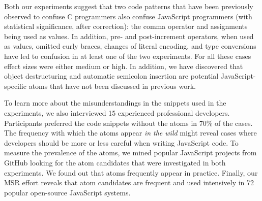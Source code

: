 Both our experiments suggest that two code patterns that have been previously observed to confuse C programmers also confuse JavaScript programmers (with statistical significance, after correction): the comma operator and assignments being used as values. In addition, pre- and post-increment operators, when used as values, omitted curly braces, changes of literal encoding, and type conversions have led to confusion in at least one of the two experiments. For all these cases effect sizes were either medium or high. In addition, we have discovered that object destructuring and automatic semicolon insertion are potential JavaScript-specific atoms that have not been discussed in previous work.

To learn more about the misunderstandings in the snippets used in the experiments, we also interviewed 15 experienced professional developers. Participants preferred the code snippets without the atoms in 70\% of the cases. The frequency with which the atoms appear \emph{in the wild} might reveal cases where developers should be more or less careful when writing JavaScript code. To measure the prevalence of the atoms, we mined popular JavaScript projects from GitHub looking for the atom candidates that were investigated in both experiments. We found out that atoms frequently appear in practice. Finally, 
our MSR effort reveals that atom candidates are frequent and used intensively in 72 popular open-source JavaScript systems.


